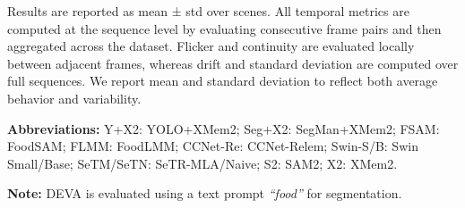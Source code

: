 \documentclass[preprint,12pt]{elsarticle}
\begin{document}
\begin{table}[!htb]
\begin{tabular}{lcccccccccccccccccccc}
\bottomrule
\end{tabular}
\raggedright
\tiny

\vspace{0.5em}
Results are reported as mean ± std over scenes. All temporal metrics are computed at the sequence level by evaluating consecutive frame pairs and then aggregated across the dataset. Flicker and continuity are evaluated locally between adjacent frames, whereas drift and standard deviation are computed over full sequences. We report mean and standard deviation to reflect both average behavior and variability. 


\textbf{Abbreviations:}
Y+X2: YOLO+XMem2; Seg+X2: SegMan+XMem2; FSAM: FoodSAM; FLMM: FoodLMM;
CCNet-Re: CCNet-Relem; Swin-S/B: Swin Small/Base; SeTM/SeTN: SeTR-MLA/Naive;
S2: SAM2; X2: XMem2.

\vspace{2pt}
\textbf{Note:} DEVA is evaluated using a text prompt \emph{``food''} for segmentation.
\end{table}


\end{document}
